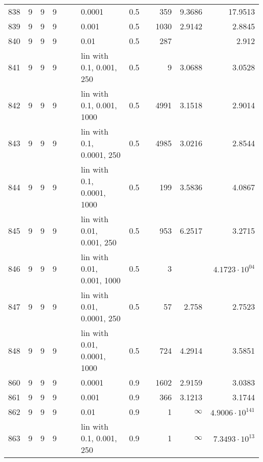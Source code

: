 \begin{longtable}{lrrrrrlrrrrr}
  838 &       9 & 9 & 9 &   &   &                      0.0001 &      0.5 &        &     359 &                 9.3686 &                17.9513 \\
  839 &       9 & 9 & 9 &   &   &                       0.001 &      0.5 &        &    1030 &                 2.9142 &                 2.8845 \\
  840 &       9 & 9 & 9 &   &   &                        0.01 &      0.5 &        &     287 &                        &                  2.912 \\
  841 &       9 & 9 & 9 &   &   &    lin with 0.1, 0.001, 250 &      0.5 &        &       9 &                 3.0688 &                 3.0528 \\
  842 &       9 & 9 & 9 &   &   &   lin with 0.1, 0.001, 1000 &      0.5 &        &    4991 &                 3.1518 &                 2.9014 \\
  843 &       9 & 9 & 9 &   &   &   lin with 0.1, 0.0001, 250 &      0.5 &        &    4985 &                 3.0216 &                 2.8544 \\
  844 &       9 & 9 & 9 &   &   &  lin with 0.1, 0.0001, 1000 &      0.5 &        &     199 &                 3.5836 &                 4.0867 \\
  845 &       9 & 9 & 9 &   &   &   lin with 0.01, 0.001, 250 &      0.5 &        &     953 &                 6.2517 &                 3.2715 \\
  846 &       9 & 9 & 9 &   &   &  lin with 0.01, 0.001, 1000 &      0.5 &        &       3 &                        &  $4.1723\cdot 10^{04}$ \\
  847 &       9 & 9 & 9 &   &   &  lin with 0.01, 0.0001, 250 &      0.5 &        &      57 &                  2.758 &                 2.7523 \\
  848 &       9 & 9 & 9 &   &   & lin with 0.01, 0.0001, 1000 &      0.5 &        &     724 &                 4.2914 &                 3.5851 \\
  860 &       9 & 9 & 9 &   &   &                      0.0001 &      0.9 &        &    1602 &                 2.9159 &                 3.0383 \\
  861 &       9 & 9 & 9 &   &   &                       0.001 &      0.9 &        &     366 &                 3.1213 &                 3.1744 \\
  862 &       9 & 9 & 9 &   &   &                        0.01 &      0.9 &        &       1 &               $\infty$ & $4.9006\cdot 10^{141}$ \\
  863 &       9 & 9 & 9 &   &   &    lin with 0.1, 0.001, 250 &      0.9 &        &       1 &               $\infty$ &  $7.3493\cdot 10^{13}$ \\

\end{longtable}

